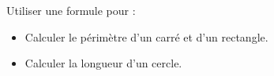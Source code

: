 \begin{prerequis}
    Utiliser une formule pour : 
    
    \begin{itemize}        
        \item[\emoji{diamond-suit}] Calculer le périmètre d’un carré et d’un rectangle.
        \item[\emoji{diamond-suit}] Calculer la longueur d’un cercle.
    \end{itemize}
\end{prerequis}
